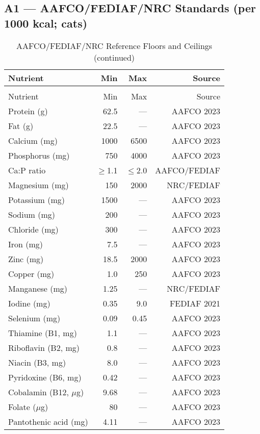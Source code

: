 \subsection*{A1 --- AAFCO/FEDIAF/NRC Standards (per 1000 kcal; cats)}
\begin{center}
\begin{minipage}{\textwidth}
\begin{longtable}{p{4cm} r r r}
\caption{AAFCO/FEDIAF/NRC Reference Floors and Ceilings}\\
\toprule
Nutrient & Min & Max & Source \\
\midrule
\endfirsthead
\caption{AAFCO/FEDIAF/NRC Reference Floors and Ceilings (continued)}\\
\toprule
Nutrient & Min & Max & Source \\
\midrule
\endhead
Protein (g) & 62.5 & --- & AAFCO 2023 \\
Fat (g) & 22.5 & --- & AAFCO 2023 \\
Calcium (mg) & 1000 & 6500 & AAFCO 2023 \\
Phosphorus (mg) & 750 & 4000 & AAFCO 2023 \\
Ca:P ratio & $\ge$1.1 & $\le$2.0 & AAFCO/FEDIAF \\
Magnesium (mg) & 150 & 2000 & NRC/FEDIAF \\
Potassium (mg) & 1500 & --- & AAFCO 2023 \\
Sodium (mg) & 200 & --- & AAFCO 2023 \\
Chloride (mg) & 300 & --- & AAFCO 2023 \\
Iron (mg) & 7.5 & --- & AAFCO 2023 \\
Zinc (mg) & 18.5 & 2000 & AAFCO 2023 \\
Copper (mg) & 1.0 & 250 & AAFCO 2023 \\
Manganese (mg) & 1.25 & --- & NRC/FEDIAF \\
Iodine (mg) & 0.35 & 9.0 & FEDIAF 2021 \\
Selenium (mg) & 0.09 & 0.45 & AAFCO 2023 \\
Thiamine (B1, mg) & 1.1 & --- & AAFCO 2023 \\
Riboflavin (B2, mg) & 0.8 & --- & AAFCO 2023 \\
Niacin (B3, mg) & 8.0 & --- & AAFCO 2023 \\
Pyridoxine (B6, mg) & 0.42 & --- & AAFCO 2023 \\
Cobalamin (B12, $\mu$g) & 9.68 & --- & AAFCO 2023 \\
Folate ($\mu$g) & 80 & --- & AAFCO 2023 \\
Pantothenic acid (mg) & 4.11 & --- & AAFCO 2023 \\

\end{longtable}
\end{minipage}
\end{center}
